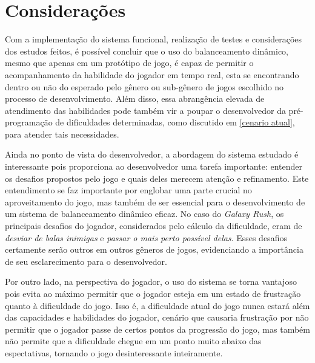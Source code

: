 \section{Considerações}

Com a implementação do sistema funcional, realização de testes e considerações dos estudos feitos, é possível concluir que o uso do balanceamento dinâmico, mesmo que apenas em um protótipo de jogo, é capaz de permitir o acompanhamento da habilidade do jogador em tempo real, esta se encontrando dentro ou não do esperado pelo gênero ou sub-gênero de jogos escolhido no processo de desenvolvimento. Além disso, essa abrangência elevada de atendimento das habilidades pode também vir a poupar o desenvolvedor da pré-programação de dificuldades determinadas, como discutido em \ref{cenario atual}, para atender tais necessidades.

Ainda no ponto de vista do desenvolvedor, a abordagem do sistema estudado é interessante pois proporciona ao desenvolvedor uma tarefa importante: entender os desafios propostos pelo jogo e quais deles merecem atenção e refinamento. Este entendimento se faz importante por englobar uma parte crucial no aproveitamento do jogo, mas também de ser essencial para o desenvolvimento de um sistema de balanceamento dinâmico eficaz. No caso do \textit{Galaxy Rush}, os principais desafios do jogador, considerados pelo cálculo da dificuldade, eram de \textit{desviar de balas inimigas} e \textit{passar o mais perto possível delas}. Esses desafios certamente serão outros em outros gêneros de jogos, evidenciando a importância de seu esclarecimento para o desenvolvedor.

Por outro lado, na perspectiva do jogador, o uso do sistema se torna vantajoso pois evita ao máximo permitir que o jogador esteja em um estado de frustração quanto à dificuldade do jogo. Isso é, a dificuldade atual do jogo nunca estará além das capacidades e habilidades do jogador, cenário que causaria frustração por não permitir que o jogador passe de certos pontos da progressão do jogo, mas também não permite que a dificuldade chegue em um ponto muito abaixo das espectativas, tornando o jogo desinteressante inteiramente.